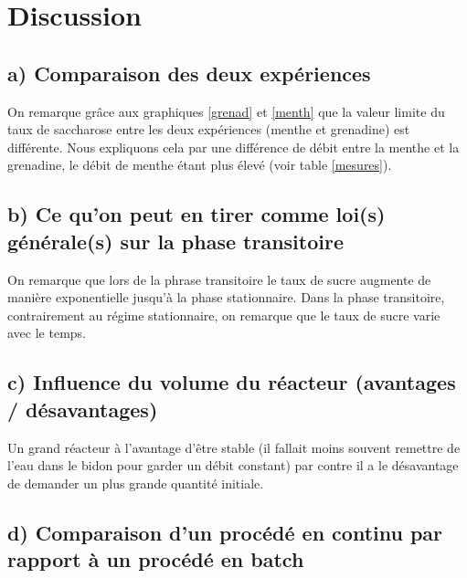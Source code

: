 \documentclass[a4paper,11pt]{article}
\begin{document}
		

\section{Discussion}
\subsection*{a) Comparaison des deux expériences}
On remarque grâce aux graphiques \ref{grenad} et \ref{menth} que la valeur limite du taux de saccharose entre les deux expériences (menthe et grenadine) est différente. Nous expliquons cela par une différence de débit entre la menthe et la grenadine, le débit de menthe étant plus élevé (voir table \ref{mesures}).

\subsection*{b) Ce qu'on peut en tirer comme loi(s) générale(s) sur la phase transitoire}
On remarque que lors de la phrase transitoire le taux de sucre augmente de manière exponentielle jusqu'à la phase stationnaire. Dans la phase transitoire, contrairement au régime stationnaire, on remarque que le taux de sucre varie avec le temps.

\subsection*{c) Influence du volume du réacteur (avantages / désavantages)}

Un grand réacteur à l'avantage d'être stable (il fallait moins souvent remettre de l'eau dans le bidon pour garder un débit constant) par contre il a le désavantage de demander un plus grande quantité initiale.

\subsection*{d) Comparaison d'un procédé en continu par rapport à un procédé en batch}
\end{document}
